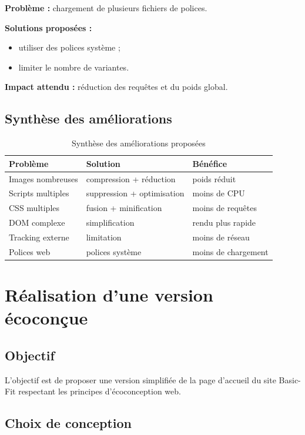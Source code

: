 \documentclass[11pt,a4paper]{article}
\begin{document}
\textbf{Problème :} chargement de plusieurs fichiers de polices.

\textbf{Solutions proposées :}
\begin{itemize}
\item utiliser des polices système ;
\item limiter le nombre de variantes.
\end{itemize}

\textbf{Impact attendu :} réduction des requêtes et du poids global.

\subsection{Synthèse des améliorations}

\begin{table}[H]
\centering
\caption{Synthèse des améliorations proposées}
\begin{tabularx}{\textwidth}{|Y|Y|Y|}
\hline
Problème & Solution & Bénéfice \\
\hline
Images nombreuses & compression + réduction & poids réduit \\
\hline
Scripts multiples & suppression + optimisation & moins de CPU \\
\hline
CSS multiples & fusion + minification & moins de requêtes \\
\hline
DOM complexe & simplification & rendu plus rapide \\
\hline
Tracking externe & limitation & moins de réseau \\
\hline
Polices web & polices système & moins de chargement \\
\hline
\end{tabularx}
\end{table}

\section{Réalisation d'une version écoconçue}

\subsection{Objectif}

L'objectif est de proposer une version simplifiée de la page d'accueil du site Basic-Fit respectant les principes d'écoconception web.

\subsection{Choix de conception}
\end{document}

